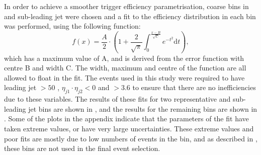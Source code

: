 In order to achieve a smoother trigger efficiency parametrisation, coarse bins in \Mjj and sub-leading jet \pt were chosen and a fit to the \METnoMU efficiency distribution in each bin was performed, using the following function:
\begin{equation}
  \label{eq:parkedtrigfunc}
  f\left(x\right)=\frac{A}{2}\cdot\left(1+ \frac{2}{\sqrt{\pi}}\int_{0}^{\frac{x-B}{\sqrt{C}}}e^{-t^{2}}\mathrm{d}t\right),
\end{equation}
which has a maximum value of A, and is derived from the error function with centre B and width C. The width, maximum and centre of the function are all allowed to float in the fit. The events used in this study were required to have leading jet \pt$>50$ \GeV, $\eta_{j1}\cdot\eta_{j2}<0$ and \detajj$>3.6$ to ensure that there are no inefficiencies due to these variables. The results of these fits for two representative \Mjj and sub-leading jet \pt bins are shown in , and the results for the remaining bins are shown in . Some of the plots in the appendix indicate that the parameters of the fit have taken extreme values, or have very large uncertainties. These extreme values and poor fits are mostly due to low numbers of events in the bin, and as described in , these bins are not used in the final event selection.


